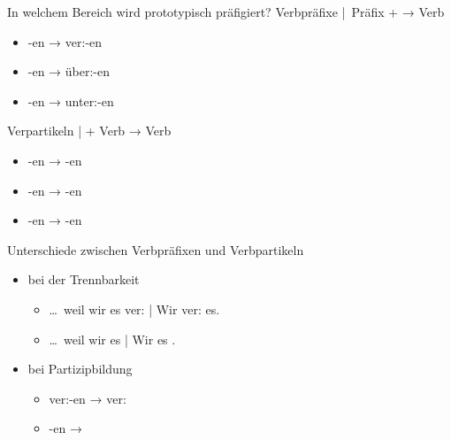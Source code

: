 \begin{frame}
  {In welchem Bereich wird prototypisch präfigiert?}
  \onslide<+->
  \onslide<+->
  Verbpräfixe | \alert{Präfix} +  → Verb\\
  \Halbzeile
  \begin{itemize}[<+->]
    \item {}-en → \alert{ver:}-en
    \item {}-en → \alert{über:}-en
    \item {}-en → \alert{unter:}-en
  \end{itemize}
  \Zeile
  \onslide<+->
  Verpartikeln |  + \alert{Verb} → Verb\\
  \Halbzeile
  \begin{itemize}[<+->]
    \item {}-en → -en
    \item {}-en → -en
    \item {}-en → -en
  \end{itemize}
\end{frame}

\begin{frame}
  {Unterschiede zwischen Verbpräfixen und Verbpartikeln}
  \onslide<+->
  \begin{itemize}[<+->]
    \item bei der Trennbarkeit
      \begin{itemize}[<+->]
        \item \ldots\ weil wir es \alert{ver:} | Wir \alert{ver:} es.
        \item \ldots\ weil wir es  | Wir  es .
      \end{itemize}
      \Zeile
    \item bei Partizipbildung
      \begin{itemize}[<+->]
        \item \alert{ver:}-en → \alert{ver:}
        \item {}-en → 
      \end{itemize}
  \end{itemize}
  \onslide<+->

  \Zeile
  \centering 
\end{frame}

